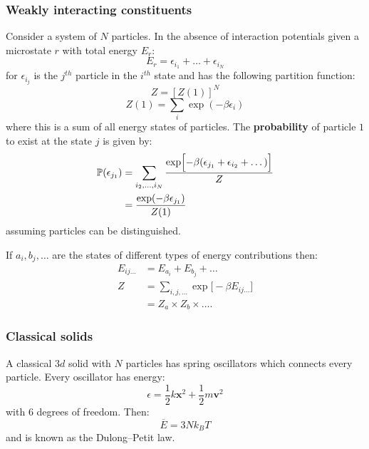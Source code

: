 \documentclass{article}
\newcommand{\vc}[1]{\boldsymbol{#1}}
\begin{document}
\begin{multicols*}{3}
\subsubsection*{Weakly interacting constituents}
Consider a system of $N$ particles.
In the absence of interaction potentials given a microstate
$r$ with total energy $E_r$:
$$E_r=\epsilon_{i_1}+\dots+\epsilon_{i_N}$$
for $\epsilon_{i_j}$ is the $j^{th}$ particle in the $i^{th}$ state
and has the following partition function:
$$Z=[Z(1)]^N$$
$$Z(1)=\sum_i\exp(-\beta\epsilon_i)$$
where this is a sum of all energy states of particles.
The \textbf{probability} of particle $1$ to exist at 
the state $j$ is given by:
\begin{align*}
    \mathbb{P}(\epsilon_{j_1})
    &=\sum_{i_2,\dots,i_N}\frac{\exp\Bigl[-\beta
    (\epsilon_{j_1}+\epsilon_{i_2}+\dots)\Bigr]}{Z} \\
    &=\frac{\exp(-\beta\epsilon_{j_1})}{Z(1)}
\end{align*}
assuming particles can be distinguished.

If $a_i,b_j,\dots$ are the states of different types of energy
contributions then:
\begin{align*}
    E_{ij\dots}&=E_{a_i}+E_{b_j}+\dots \\
    Z
    &=\sum_{i,j,\dots}\exp\bigl[-\beta E_{ij\dots}\bigr] \\
    &=Z_{a}\times Z_{b}\times\dots.
\end{align*}

\subsubsection*{Classical solids}
A classical $3d$ solid with $N$ particles has
spring oscillators which connects every particle.
Every oscillator has energy:
$$\epsilon=\frac{1}{2}k\vc{x}^2+\frac{1}{2}m\vc{v}^2$$
with $6$ degrees of freedom. Then:
$$\overline{E}=3Nk_B T$$
and is known as the Dulong--Petit law.


\end{multicols*}
\end{document}
